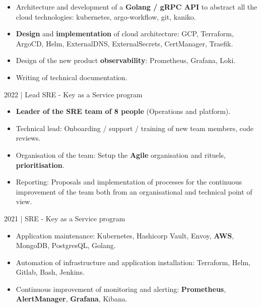 \documentclass[
	a4paper,
	maincolor=cvartifakt,
	sidecolor=cvgray,
	sidebartextcolor=cvwhite,
	sectioncolor=cvartifakt,
	subsectioncolor=cvgray,
	sidebarwidth=0.36\paperwidth,
    topbottommargin=0.04\paperheight,
]{fortysecondscv}
\makeatletter
\newcommand\thefontsize{\f@size pt}
\makeatother
\begin{document}
\makefrontsidebar{}

\begin{cvtable}[2]
	{
		\vspace{-8pt}
		\begin{itemize}
			\item Architecture and development of a \textbf{Golang / gRPC API} to abstract all the cloud technologies: kubernetes, argo-workflow, git, kaniko.
			\item \textbf{Design} and \textbf{implementation} of cloud architecture: GCP, Terraform, ArgoCD, Helm, ExternalDNS, ExternalSecrets, CertManager, Traefik.
			\item Design of the new product \textbf{observability}: Prometheus, Grafana, Loki.
			\item Writing of technical documentation.
		\end{itemize}
	}
	{
		\textcolor{maincolor}{2022 | Lead SRE - Key as a Service program}
			\begin{itemize}
				\item \textbf{Leader of the SRE team of 8 people} (Operations and platform).
				\item Technical lead: Onboarding / support / training of new team members, code reviews.
				\item Organisation of the team: Setup the \textbf{Agile} organisation and rituels, \textbf{prioritisation}.
				\item Reporting: Proposals and implementation of processes for the continuous improvement of the team both from an organisational and technical point of view.
			\end{itemize}
			\vspace{8pt}
			\textcolor{maincolor}{2021 | SRE - Key as a Service program}
			\begin{itemize}
				\item Application maintenance: Kubernetes, Hashicorp Vault, Envoy, \textbf{AWS}, MongoDB, PostgresQL, Golang.
				\item Automation of infrastructure and application installation: Terraform, Helm, Gitlab, Bash, Jenkins.
				\item Continuous improvement of monitoring and alerting: \textbf{Prometheus}, \textbf{AlertManager}, \textbf{Grafana}, Kibana.

\end{itemize}}
\end{cvtable}
\end{document}
